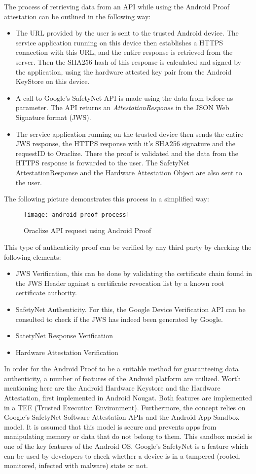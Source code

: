 The process of retrieving data from an API while using the Android Proof attestation can be outlined in the following way:
\begin{itemize}
	\item The URL provided by the user is sent to the trusted Android device. The service application running on this device then establishes a HTTPS connection with this URL, and the entire response is retrieved from the server. Then the SHA256 hash of this response is calculated and signed by the application, using the hardware attested key pair from the Android KeyStore on this device.
	\item A call to Google's SafetyNet API is made using the data from before as parameter. The API returns an \emph{AttestationResponse} in the JSON Web Signature format (JWS).
	\item The service application running on the trusted device then sends the entire JWS response, the HTTPS response with it's SHA256 signature and the requestID to Oraclize. There the proof is validated and the data from the HTTPS response is forwarded to the user. The SafetyNet AttestationResponse and the Hardware Attestation Object are also sent to the user.
\end{itemize}

The following picture demonstrates this process in a simplified way:
\begin{figure}[H]
\centering
\texttt{[image: android\_proof\_process]}
\caption{Oraclize API request using Android Proof\cite{androidproof}}
\end{figure}
This type of authenticity proof can be verified by any third party by checking the following elements:
\begin{itemize}
	\item JWS Verification, this can be done by validating the certificate chain found in the JWS Header against a certificate revocation list by a known root certificate authority.
	\item SafetyNet Authenticity. For this, the Google Device Verification API can be consulted to check if the JWS has indeed been generated by Google.
	\item SatetyNet Response Verification
	\item Hardware Attestation Verification
\end{itemize}

In order for the Android Proof to be a suitable method for guaranteeing data authenticity, a number of features of the Android platform are utilized. Worth mentioning here are the Android Hardware Keystore and the Hardware Attestation, first implemented in Android Nougat. Both features are implemented in a TEE (Trusted Execution Environment). Furthermore, the concept relies on Google's SafetyNet Software Attestation APIs and the Android App Sandbox model. It is assumed that this model is secure and prevents apps from manipulating memory or data that do not belong to them. This sandbox model is one of the key features of the Android OS. Google's SafetyNet is a feature which can be used by developers to check whether a device is in a tampered (rooted, monitored, infected with malware) state or not.

